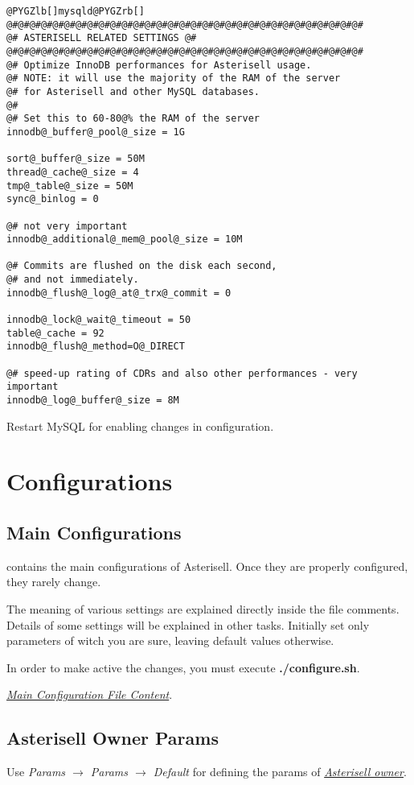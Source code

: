 \documentclass[letterpaper,10pt,english]{sphinxmanual}
\begin{document}
\begin{Verbatim}[commandchars=@\[\]]
@PYGZlb[]mysqld@PYGZrb[]
@#@#@#@#@#@#@#@#@#@#@#@#@#@#@#@#@#@#@#@#@#@#@#@#@#@#@#@#@#@#@#
@# ASTERISELL RELATED SETTINGS @#
@#@#@#@#@#@#@#@#@#@#@#@#@#@#@#@#@#@#@#@#@#@#@#@#@#@#@#@#@#@#@#
@# Optimize InnoDB performances for Asterisell usage.
@# NOTE: it will use the majority of the RAM of the server
@# for Asterisell and other MySQL databases.
@#
@# Set this to 60-80@% the RAM of the server
innodb@_buffer@_pool@_size = 1G

sort@_buffer@_size = 50M
thread@_cache@_size = 4
tmp@_table@_size = 50M
sync@_binlog = 0

@# not very important
innodb@_additional@_mem@_pool@_size = 10M

@# Commits are flushed on the disk each second,
@# and not immediately.
innodb@_flush@_log@_at@_trx@_commit = 0

innodb@_lock@_wait@_timeout = 50
table@_cache = 92
innodb@_flush@_method=O@_DIRECT

@# speed-up rating of CDRs and also other performances - very important
innodb@_log@_buffer@_size = 8M
\end{Verbatim}

Restart MySQL for enabling changes in configuration.


\chapter{Configurations}
\label{index:configurations}

\section{Main Configurations}
\label{index:main-configurations}\label{index:id2}
 contains the main configurations of Asterisell. Once they are properly configured, they rarely change.

The meaning of various settings are explained directly inside the file comments. Details of some settings will be explained in other tasks. Initially set only parameters of witch you are sure, leaving default values otherwise.

In order to make active the changes, you must execute \textbf{./configure.sh}.

{\hyperref[index:main-configuration-file]{\emph{Main Configuration File Content}}}.


\section{Asterisell Owner Params}
\label{index:asterisell-owner}\label{index:asterisell-owner-params}
Use \emph{Params \(\rightarrow\) Params \(\rightarrow\) Default} for defining the params of {\hyperref[index:term-asterisell-owner]{\emph{Asterisell owner}}}.
\end{document}
